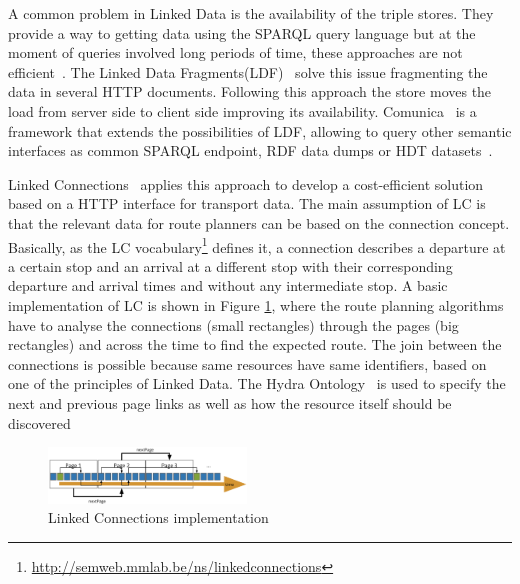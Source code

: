 \documentclass[sw]{iosart2x}
\begin{document}
A common problem in Linked Data is the availability of the triple stores. They provide a way to getting data using the SPARQL query language but at the moment of queries involved long periods of time, these approaches are not efficient~\cite{verborgh2014querying}. The Linked Data Fragments(LDF)~\cite{verborgh2016triple,verborgh2014web} solve this issue fragmenting the data in several HTTP documents. Following this approach the store moves the load from server side to client side improving its availability. Comunica~\cite{taelman2018comunica} is a framework that extends the possibilities of LDF, allowing to query other semantic interfaces as common SPARQL endpoint, RDF data dumps or HDT datasets~\cite{fernandez2013binary}. 

Linked Connections~\cite{colpaert2015intermodal} applies this approach to develop a cost-efficient solution based on a HTTP interface for transport data. The main assumption of LC is that the relevant data for route planners can be based on the connection concept. Basically, as the LC vocabulary\footnote{\url{http://semweb.mmlab.be/ns/linkedconnections}} defines it, a connection describes a departure at a certain stop and an arrival at a different stop with their corresponding departure and arrival times and without any intermediate stop. A basic implementation of LC is shown in Figure \ref{fig:lc_imp}, where the route planning algorithms have to analyse the connections (small rectangles) through the pages (big rectangles) and across the time to find the expected route. The join between the connections is possible because same resources have same identifiers, based on one of the principles of Linked Data. The Hydra Ontology~\cite{lanthaler2013hydra} is used to specify the next and previous page links as well as how the resource itself should be discovered


\begin{figure}[t]
	\includegraphics[width=0.47\textwidth]{images/implementation.png}
	\caption{Linked Connections implementation}\label{fig:lc_imp}
\end{figure}
\end{document}
